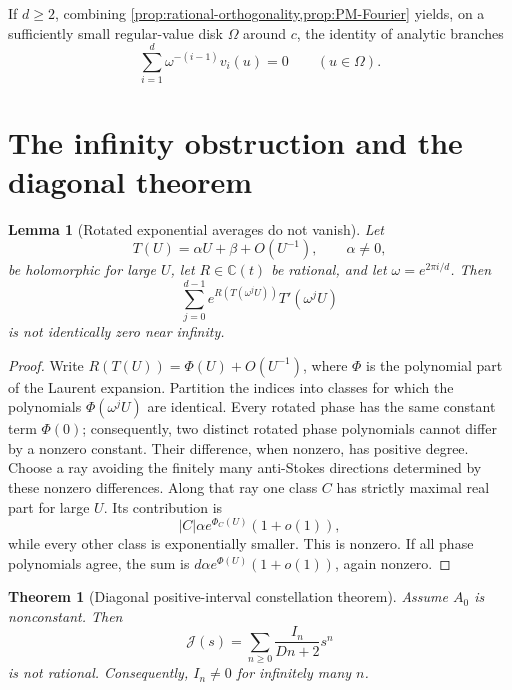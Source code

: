 \documentclass[11pt]{article}
\numberwithin{equation}{section}
\newtheorem{theorem}{Theorem}[section]
\newtheorem{lemma}[lemma]{Lemma}
\theoremstyle{definition}
\theoremstyle{remark}
\newcommand{\C}{\mathbb C}
\newcommand{\Jcal}{\mathcal J}
\begin{document}
If $d\ge2$, combining
\cref{prop:rational-orthogonality,prop:PM-Fourier} yields, on a sufficiently
small regular-value disk $\Omega$ around $c$, the identity of analytic
branches
\begin{equation}\label{eq:primitive-relation}
  \sum_{i=1}^d\omega^{-(i-1)}v_i(u)=0
  \qquad(u\in\Omega).
\end{equation}

\section{The infinity obstruction and the diagonal theorem}\label{sec:infinity}

\begin{lemma}[Rotated exponential averages do not vanish]\label{lem:rotated-exp}
Let
\[
  T(U)=\alpha U+\beta+O(U^{-1}),
  \qquad \alpha\neq0,
\]
be holomorphic for large $U$, let $R\in\C(t)$ be rational, and let $\omega=e^{2\pi i/d}$.  Then
\[
  \sum_{j=0}^{d-1}e^{R(T(\omega^jU))}T'(\omega^jU)
\]
is not identically zero near infinity.
\end{lemma}

\begin{proof}
Write $R(T(U))=\Phi(U)+O(U^{-1})$, where $\Phi$ is the
polynomial part of the Laurent expansion.  Partition the indices into
classes for which the polynomials $\Phi(\omega^jU)$ are identical.
Every rotated phase has the same constant term $\Phi(0)$; consequently,
two distinct rotated phase polynomials cannot differ by a nonzero
constant.  Their difference, when nonzero, has positive degree.  Choose
a ray avoiding the finitely many anti-Stokes directions determined by
these nonzero differences.  Along that ray one class $C$ has strictly
maximal real part for large $U$.  Its contribution is
\[
  |C|\alpha e^{\Phi_C(U)}(1+o(1)),
\]
while every other class is exponentially smaller.  This is nonzero.  If all phase polynomials agree, the sum is $d\alpha e^{\Phi(U)}(1+o(1))$, again nonzero.
\end{proof}

\begin{theorem}[Diagonal positive-interval constellation theorem]\label{thm:diagonal}
Assume $A_0$ is nonconstant.  Then
\[
  \Jcal(s)=\sum_{n\ge0}\frac{I_n}{Dn+2}s^n
\]
is not rational.  Consequently, $I_n\neq0$ for infinitely many $n$.
\end{theorem}
\end{document}
